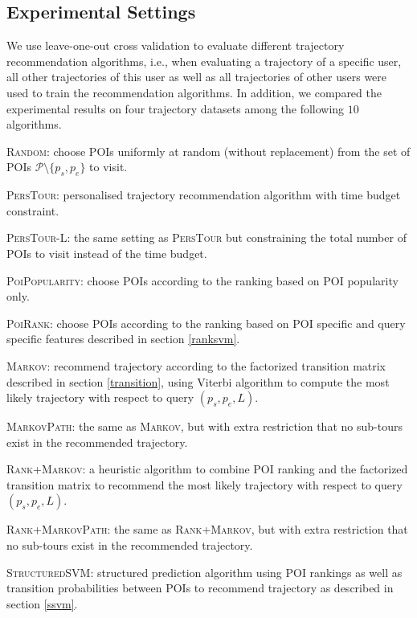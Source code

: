 \subsection{Experimental Settings}
We use leave-one-out cross validation to evaluate different trajectory recommendation algorithms,
i.e., when evaluating a trajectory of a specific user, all other trajectories of this user as well as 
all trajectories of other users were used to train the recommendation algorithms.
In addition, we compared the experimental results on four trajectory datasets among the following $10$ algorithms.

\textsc{Random}: choose POIs uniformly at random (without replacement) 
    from the set of POIs $\mathcal{P} \setminus \{p_s, p_e \}$ to visit.

\textsc{PersTour}\cite{ijcai15}: personalised trajectory recommendation algorithm with time budget constraint.

\textsc{PersTour-L}: the same setting as \textsc{PersTour} but constraining the total number of POIs to visit 
    instead of the time budget.

\textsc{PoiPopularity}: choose POIs according to the ranking based on POI popularity only.

\textsc{PoiRank}: choose POIs according to the ranking based on POI specific and query specific features 
    described in section \ref{ranksvm}.

\textsc{Markov}: recommend trajectory according to the factorized transition matrix described in section \ref{transition},
    using Viterbi algorithm to compute the most likely trajectory with respect to query $(p_s, p_e, L)$.

\textsc{MarkovPath}: the same as \textsc{Markov}, but with extra restriction that no sub-tours exist in the 
    recommended trajectory.

\textsc{Rank+Markov}: a heuristic algorithm to combine POI ranking and the factorized transition matrix 
    to recommend the most likely trajectory with respect to query $(p_s, p_e, L)$.

\textsc{Rank+MarkovPath}: the same as \textsc{Rank+Markov}, but with extra restriction that no sub-tours exist in 
    the recommended trajectory.

\textsc{StructuredSVM}: structured prediction algorithm using POI rankings as well as transition probabilities
    between POIs to recommend trajectory as described in section \ref{ssvm}.

